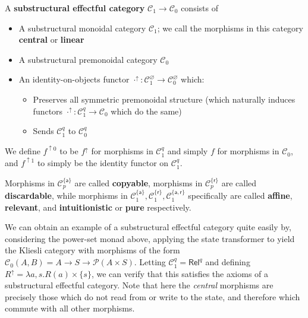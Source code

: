 \documentclass[acmsmall,screen,review]{acmart}
\newcommand{\mc}[1]{\ensuremath{\mathcal{#1}}}
\newcommand{\ms}[1]{\ensuremath{\mathsf{#1}}}
\newcommand{\upg}[2]{{#1}^{\uparrow #2}}
\begin{document}
\begin{definition}
  A \textbf{substructural effectful category} \(\mc{C}_1 \to \mc{C}_0\) consists of
  \begin{itemize}
    \item A substructural monoidal category \(\mc{C}_1\); we call the morphisms in this category \textbf{central} or \textbf{linear}
    \item A substructural premonoidal category \(\mc{C}_0\)
    \item An identity-on-objects functor \(\upg{\cdot}{}: \mc{C}_1^\varnothing \to \mc{C}_0^\varnothing\) which:
    \begin{itemize}
      \item Preserves all symmetric premonoidal structure (which naturally induces functors \(\upg{\cdot}{}: \mc{C}_1^q \to \mc{C}_0\) which do the same)
      \item Sends \(\mc{C}_1^q\) to \(\mc{C}_0^q\)
    \end{itemize}
  \end{itemize}
  We define \(\upg{f}{0}\) to be \(\upg{f}{}\) for morphisms in \(\mc{C}_1^q\) and simply \(f\) for morphisms in \(\mc{C}_0\), and \(\upg{f}{1}\) to simply be the identity functor on \(\mc{C}_1^q\).

  Morphisms in \(\mc{C}_p^{\{\ms{a}\}}\) are called \textbf{copyable}, morphisms in \(\mc{C}_p^{\{\ms{r}\}}\) are called \textbf{discardable},
  while morphisms in \(\mc{C}_1^{\{\ms{a}\}}, \mc{C}_1^{\{\ms{r}\}}, \mc{C}_1^{\{\ms{a}, \ms{r}\}}\) specifically are called \textbf{affine}, \textbf{relevant}, and \textbf{intuitionistic} or \textbf{pure} respectively.
\end{definition}

We can obtain an example of a substructural effectful category quite easily by, considering the power-set monad above, applying the state transformer to yield the Kliesli category with morphisms of the form \(\mc{C}_0(A, B) = A \to S \to \mc{P}(A \times S)\). Letting \(\mc{C}_1^q = \ms{Rel}^q\) and defining
\(
  \upg{R}{} = \lambda a, s. R(a) \times \{s\}
\), we can verify that this satisfies the axioms of a substructural effectful category.
Note that here the \textit{central} morphisms are precisely those which do not read from or write to the state, and therefore which commute with all other morphisms.
\end{document}
